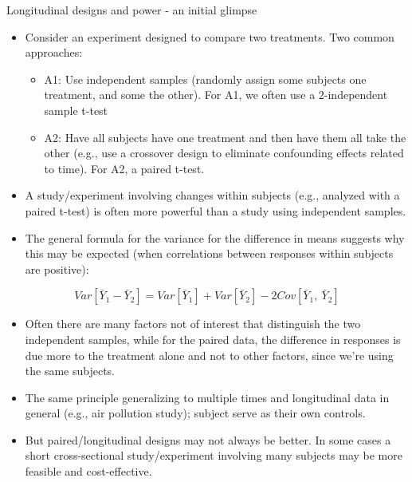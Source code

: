 \documentclass[
  9pt,
  ignorenonframetext,
]{beamer}
\providecommand{\tightlist}{%
  \setlength{\itemsep}{0pt}\setlength{\parskip}{0pt}}
\begin{document}
\begin{frame}{Longitudinal designs and power - an initial glimpse}
\protect\hypertarget{longitudinal-designs-and-power---an-initial-glimpse-1}{}
\begin{itemize}
\item
  Consider an experiment designed to compare two treatments. Two common
  approaches:

  \begin{itemize}
  \item
    A1: Use independent samples (randomly assign some subjects one
    treatment, and some the other). For A1, we often use a 2-independent
    sample t-test
  \item
    A2: Have all subjects have one treatment and then have them all take
    the other (e.g., use a crossover design to eliminate confounding
    effects related to time). For A2, a paired t-test.
  \end{itemize}
\item
  A study/experiment involving changes within subjects (e.g., analyzed
  with a paired t-test) is often more powerful than a study using
  independent samples.
\end{itemize}
\end{frame}

\begin{frame}{}
\protect\hypertarget{section-10}{}
\begin{itemize}
\tightlist
\item
  The general formula for the variance for the difference in means
  suggests why this may be expected (when correlations between responses
  within subjects are positive):
\end{itemize}

\[
Var[\bar Y_1 - \bar Y_2] = Var[\bar Y_1] + Var[\bar Y_2] - 2Cov[\bar Y_1,\ \bar Y_2]
\]

\begin{itemize}
\item
  Often there are many factors not of interest that distinguish the two
  independent samples, while for the paired data, the difference in
  responses is due more to the treatment alone and not to other factors,
  since we're using the same subjects.
\item
  The same principle generalizing to multiple times and longitudinal
  data in general (e.g., air pollution study); subject serve as their
  own controls.
\item
  But paired/longitudinal designs may not always be better. In some
  cases a short cross-sectional study/experiment involving many subjects
  may be more feasible and cost-effective.
\end{itemize}
\end{frame}
\end{document}
